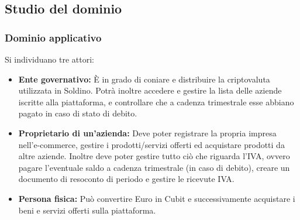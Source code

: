 \subsection{Studio del dominio}
\subsubsection{Dominio applicativo}
Si individuano tre attori:
\begin{itemize}	
	\item \textbf{Ente governativo: }\`E in grado di coniare e distribuire la 
	criptovaluta utilizzata in Soldino. Potrà inoltre accedere e gestire la lista 
delle aziende iscritte alla piattaforma, e controllare che a cadenza trimestrale 
esse abbiano pagato in caso di stato di debito.
	\item \textbf{Proprietario di un'azienda:} Deve poter registrare la propria 
impresa nell'e-commerce, gestire i prodotti/servizi offerti ed acquistare 
prodotti da altre aziende. Inoltre deve poter gestire tutto ciò che riguarda 
l'IVA, ovvero pagare l'eventuale saldo a cadenza trimestrale (in caso di 
debito), creare un documento di resoconto di periodo e gestire le ricevute IVA.
	\item \textbf{Persona fisica\glo: }Può convertire Euro in Cubit e 
successivamente acquistare i beni e servizi offerti sulla piattaforma. 
\end{itemize}
